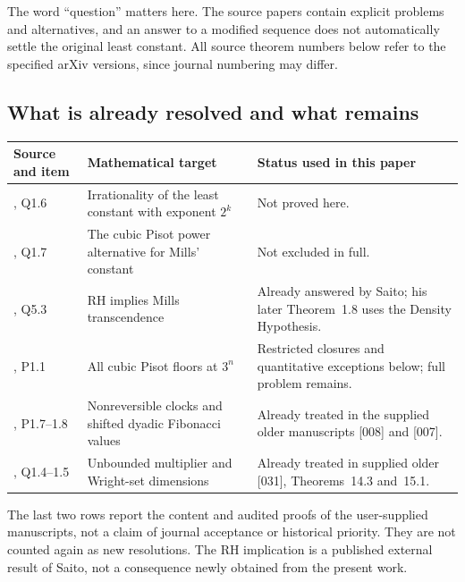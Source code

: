 \documentclass[11pt,a4paper]{article}
\theoremstyle{remark}\newtheorem{remark}[theorem]{Remark}
\begin{document}
The word ``question'' matters here. The source papers contain
explicit problems and alternatives, and an answer to a modified
sequence does not automatically settle the original least constant.
All source theorem numbers below refer to the specified arXiv
versions, since journal numbering may differ.

\subsection{What is already resolved and what remains}
\begin{center}\small
\begin{tabular}{p{}p{}p{}}
\toprule
Source and item & Mathematical target & Status used in this paper\\
\midrule
\cite{SaitoIrrational}, Q1.6 & Irrationality of the least constant with exponent $2^k$ & Not proved here.\\
\cite{SaitoIrrational}, Q1.7 & The cubic Pisot power alternative for Mills' constant & Not excluded in full.\\
\cite{SaitoIrrational}, Q5.3 & RH implies Mills transcendence & Already answered by Saito; his later Theorem~1.8 uses the Density Hypothesis.\\
\cite{SaitoIntervals}, P1.1 & All cubic Pisot floors at $3^n$ & Restricted closures and quantitative exceptions below; full problem remains.\\
\cite{SaitoIntervals}, P1.7--1.8 & Nonreversible clocks and shifted dyadic Fibonacci values & Already treated in the supplied older manuscripts [008] and [007].\\
\cite{SaitoDimension}, Q1.4--1.5 & Unbounded multiplier and Wright-set dimensions & Already treated in supplied older [031], Theorems~14.3 and~15.1.\\
\bottomrule
\end{tabular}
\end{center}
The last two rows report the content and audited proofs of the
user-supplied manuscripts, not a claim of journal acceptance or
historical priority. They are not counted again as new resolutions.
The RH implication is a published external result of Saito, not a
consequence newly obtained from the present work.
\end{document}
